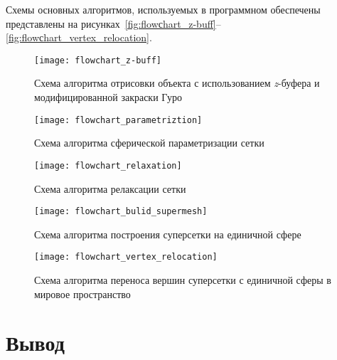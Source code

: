 Схемы основных алгоритмов, используемых в программном обеспечены представлены на рисунках~\ref{fig:flowсhart_z-buff}--\ref{fig:flowсhart_vertex_relocation}.

\begin{figure}[H]
    \label{fig:flowchart_z-buff}
    \texttt{[image: flowchart\_z-buff]}
    \caption{Схема алгоритма отрисовки объекта с использованием \textit{z}-буфера и модифицированной закраски Гуро}
\end{figure}

\begin{figure}[H]
    \label{fig:flowchart_parametrization}
    \texttt{[image: flowchart\_parametriztion]}
    \caption{Схема алгоритма сферической параметризации сетки}
\end{figure}

\begin{figure}[H]
    \label{fig:flowchart_relaxation}
    \texttt{[image: flowchart\_relaxation]}
    \caption{Схема алгоритма релаксации сетки}
\end{figure}

\begin{figure}[H]
    \label{fig:flowchart_build_supermesh}
    \texttt{[image: flowchart\_bulid\_supermesh]}
    \caption{Схема алгоритма построения суперсетки на единичной сфере}
\end{figure}

\begin{figure}[H]
    \label{fig:flowchart_vertex_relocation}
    \texttt{[image: flowchart\_vertex\_relocation]}
    \caption{Схема алгоритма переноса вершин суперсетки с единичной сферы в мировое пространство}
\end{figure}


\section*{Вывод}

\clearpage